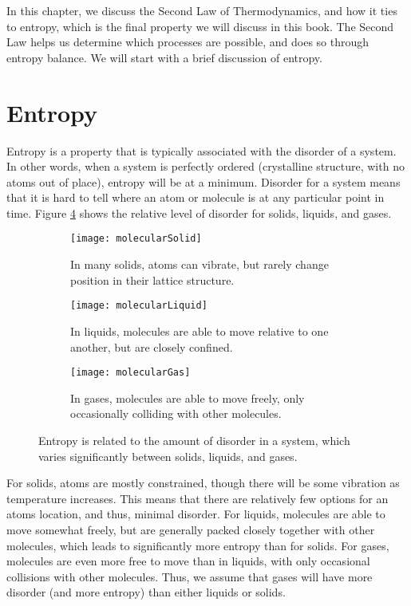 In this chapter, we discuss the Second Law of Thermodynamics, and how it ties to entropy, which is the final property we will discuss in this book.  The Second Law helps us determine which processes are possible, and does so through entropy balance.  We will start with a brief discussion of entropy.

\section{Entropy}

Entropy is a property that is typically associated with the disorder of a system.  In other words, when a system is perfectly ordered (crystalline structure, with no atoms out of place), entropy will be at a minimum.  Disorder for a system means that it is hard to tell where an atom or molecule is at any particular point in time.  Figure \ref{fig:molecularEntropy} shows the relative level of disorder for solids, liquids, and gases.

\begin{figure}[H]
\centering
\begin{subfigure}{.3\textwidth}
  \centering
  \texttt{[image: molecularSolid]}
  \caption{In many solids, atoms can vibrate, but rarely change position in their lattice structure.}
  \label{fig:molecularSolid}
\end{subfigure}\hfill
\begin{subfigure}{.3\textwidth}
  \centering
  \texttt{[image: molecularLiquid]}
  \caption{In liquids, molecules are able to move relative to one another, but are closely confined.}
  \label{fig:molecularLiquid}
\end{subfigure}\hfill
\begin{subfigure}{.3\textwidth}
  \centering
  \texttt{[image: molecularGas]}
  \caption{In gases, molecules are able to move freely, only occasionally colliding with other molecules.}
  \label{fig:molecularGas}
\end{subfigure}
\caption{Entropy is related to the amount of disorder in a system, which varies significantly between solids, liquids, and gases.}
\label{fig:molecularEntropy}
\end{figure}

For solids, atoms are mostly constrained, though there will be some vibration as temperature increases.  This means that there are relatively few options for an atoms location, and thus, minimal disorder.  For liquids, molecules are able to move somewhat freely, but are generally packed closely together with other molecules, which leads to significantly more entropy than for solids.  For gases, molecules are even more free to move than in liquids, with only occasional collisions with other molecules.  Thus, we assume that gases will have more disorder (and more entropy) than either liquids or solids.


